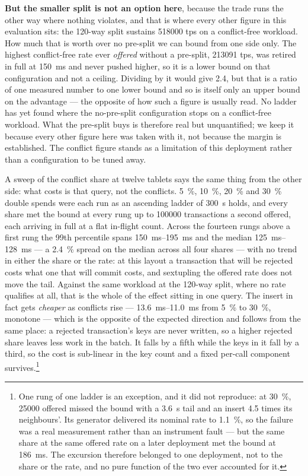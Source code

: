 \documentclass[10pt,twocolumn]{article}
\begin{document}
\textbf{But the smaller split is not an option here}, because the trade runs the other way where nothing violates,
and that is where every other figure in this evaluation sits: the \num{120}-way split sustains \num{518000} tps
on a conflict-free workload. How much that is worth over no pre-split we can bound from one side only. The
highest conflict-free rate ever \emph{offered} without a pre-split, \num{213091} tps, was retired in full at
\SI{150}{\milli\second} and never pushed higher, so it is a lower bound on that configuration and not a
ceiling. Dividing by it would give \num{2.4}, but that is a ratio of one measured number to one lower bound
and so is itself only an upper bound on the advantage --- the opposite of how such a figure is usually read.
No ladder has yet found where the no-pre-split configuration stops on a conflict-free workload. What the
pre-split buys is therefore real but unquantified; we keep it because every other figure here was taken with
it, not because the margin is established. The conflict figure stands as a limitation of this deployment rather than
a configuration to be tuned away.

A sweep of the conflict share at twelve tablets says the same thing from the other side: what costs is that
query, not the conflicts. \SI{5}{\percent}, \SI{10}{\percent}, \SI{20}{\percent} and \SI{30}{\percent}
double spends were each run as an ascending ladder of \SI{300}{\second} holds, and every share met the
bound at every rung up to \num{100000} transactions a second offered, each arriving in full at a flat
in-flight count. Across the fourteen rungs above a first rung the 99th percentile spans
\SIrange{150}{195}{\milli\second} and the median \SIrange{125}{128}{\milli\second} --- a
\SI{2.4}{\percent} spread on the median across all four shares --- with no trend in either the share or
the rate: at this layout a
transaction that will be rejected costs what one that will commit costs, and sextupling the offered rate
does not move the tail. Against the same workload at the \num{120}-way split, where no rate qualifies at
all, that is the whole of the effect sitting in one query. The insert in fact gets \emph{cheaper} as
conflicts rise --- \SIrange{13.6}{11.0}{\milli\second} from \SI{5}{\percent} to \SI{30}{\percent},
monotone --- which is the opposite of the expected direction and follows from the same place: a rejected
transaction's keys are never written, so a higher rejected share leaves less work in the batch. It falls
by a fifth while the keys in it fall by a third, so the cost is sub-linear in the key count and a fixed
per-call component survives.\footnote{One rung of one ladder is an
exception, and it did not reproduce: at \SI{30}{\percent}, \num{25000} offered missed the bound with a
\SI{3.6}{\second} tail and an insert \num{4.5} times its neighbours'. Its generator delivered its nominal
rate to \SI{1.1}{\percent}, so the failure was a real measurement rather than an instrument fault --- but
the same share at the same offered rate on a later deployment met the bound at
\SI{186}{\milli\second}. The excursion therefore belonged to one deployment, not to the share or the
rate, and no pure function of the two ever accounted for it.}
\end{document}

